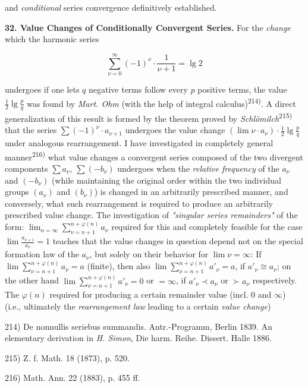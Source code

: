 \thispagestyle{fancy}

\vspace{0.5cm}

and \textit{conditional} series convergence definitively established.

\vspace{0.5cm}
\textbf{32. Value Changes of Conditionally Convergent Series.} For the \textit{change} which the harmonic series 

$$\sum_{\nu=0}^{\infty} (-1)^{\nu} \cdot \frac{1}{\nu+1} = \lg 2$$ 
\vspace{0.3cm}

undergoes if one lets $q$ negative terms follow every $p$ positive terms, the value $\frac{1}{2} \lg \frac{p}{q}$ was found by \textit{Mart. Ohm} (with the help of integral calculus)\textsuperscript{214)}. A direct generalization of this result is formed by the theorem proved by \textit{Schlömilch}\textsuperscript{215)} that the series $\sum (-1)^{\nu} \cdot a_{\nu+1}$ undergoes the value change $(\lim \nu \cdot a_\nu) \cdot \frac{1}{2} \lg \frac{p}{q}$ under analogous rearrangement. I have investigated in completely general manner\textsuperscript{216)} what value changes a convergent series composed of the two divergent components $\sum a_\nu$, $\sum (-b_\nu)$ undergoes when the \textit{relative frequency} of the $a_\nu$ and $(-b_\nu)$ (while maintaining the original order within the two individual groups $(a_\nu)$ and $(b_\nu)$) is changed in an arbitrarily prescribed manner, and conversely, what such rearrangement is required to produce an arbitrarily prescribed value change. The investigation of \textit{"singular series remainders"} of the form: $\lim_{n=\infty} \sum_{\nu=n+1}^{n+\varphi(n)} a_\nu$ required for this and completely feasible for the case $\lim \frac{a_{\nu+1}}{a_\nu} = 1$ teaches that the value changes in question depend not on the special formation law of the $a_\nu$, but solely on their behavior for $\lim \nu = \infty$: If $\lim \sum_{\nu=n+1}^{n+\varphi(n)} a_\nu = a$ (finite), then also $\lim \sum_{\nu=n+1}^{n+\varphi(n)} a'_\nu = a$, if $a'_\nu \cong a_\nu$; on the other hand $\lim \sum_{\nu=n+1}^{n+\varphi(n)} a'_\nu = 0$ or $= \infty$, if $a'_\nu \prec a_\nu$ or $\succ a_\nu$ respectively. The $\varphi(n)$ required for producing a certain remainder value (incl. 0 and $\infty$) (i.e., ultimately the \textit{rearrangement law} leading to a certain \textit{value change})

\vfill
\leftline{\rule{2in}{0.4pt}}
\vspace{0.2cm}
{
\footnotesize
214) De nonnullis seriebus summandis. Antr.-Programm, Berlin 1839. An elementary derivation in \textit{H. Simon}, Die harm. Reihe. Dissert. Halle 1886.

215) Z. f. Math. 18 (1873), p. 520.

216) Math. Ann. 22 (1883), p. 455 ff.

}